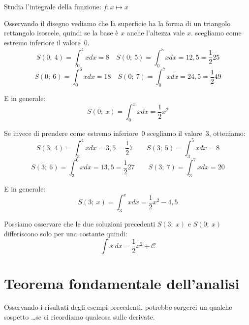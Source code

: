 \begin{esempio}
Studia l'integrale della funzione: \(f: x \mapsto x\)

\begin{minipage}{.59 \textwidth}
Osservando il disegno vediamo che la superficie ha la forma di un triangolo 
rettangolo isoscele, quindi se la base è \(x\) anche l'altezza vale \(x\).
scegliamo come estremo inferiore il valore~0.
\[S(0;~4)=\int_0^4 x dx = 8 \quad 
  S(0;~5)=\int_0^5 x dx = 12,5 = \dfrac{1}{2}25\] 
\[S(0;~6)=\int_0^6 x dx = 18 \quad 
  S(0;~7)=\int_0^7 x dx = 24,5 = \dfrac{1}{2}49\]

E in generale:
\[S(0;~x)=\int_0^x x dx = \dfrac{1}{2}x^2\]
\end{minipage}
\hfill
\begin{minipage}{.39 \textwidth}
\begin{inaccessibleblock}[]  
  \begin{center}  \end{center}
\end{inaccessibleblock}
\end{minipage}

\begin{minipage}{.59 \textwidth}
Se invece di prendere come estremo inferiore~0 scegliamo il valore~3, 
otteniamo:
\[S(3;~4)=\int_3^4 x dx = 3,5 = \dfrac{1}{2}7\qquad
  S(3;~5)=\int_3^5 x dx = 8\] 
\[S(3;~6)=\int_3^6 x dx = 13,5 = \dfrac{1}{2}27 \qquad 
  S(3;~7)=\int_3^7 x dx = 20\]

E in generale:
\[S(3;~x)=\int_3^x x dx = \dfrac{1}{2}x^2 -4,5\]
\end{minipage}
\hfill
\begin{minipage}{.39 \textwidth}
\begin{inaccessibleblock}[]  
  \begin{center}  \end{center}
\end{inaccessibleblock}
\end{minipage}

Possiamo osservare che le due soluzioni precedenti \(S(3;~x)\) e \(S(0;~x)\)
differiscono solo per una costante quindi: 
\[\int x~dx = \dfrac{1}{2}x^2 + \mathcal{C}\]
\end{esempio}

% 

\section{Teorema fondamentale dell'analisi}
\label{sec:integrali_teorema_fondamentale}
Osservando i risultati degli esempi precedenti, potrebbe sorgerci un qualche 
sospetto \dots se ci ricordiamo qualcosa sulle derivate.

